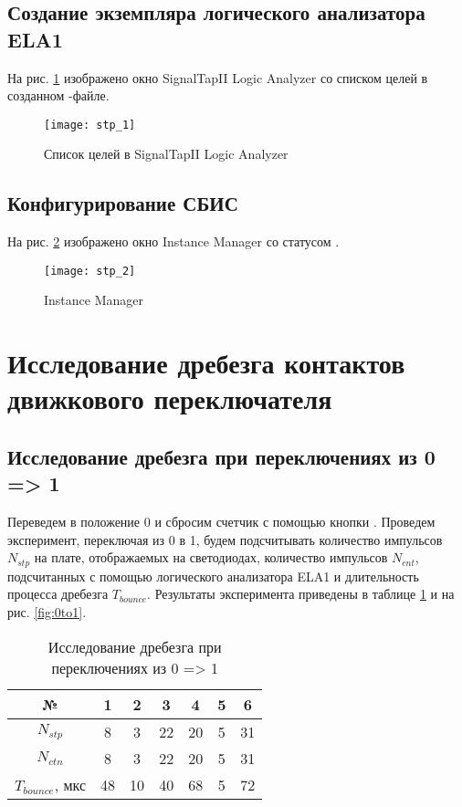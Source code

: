 \subsection{Создание экземпляра логического анализатора ELA1}

На рис. \ref{fig:stp_1} изображено окно SignalTapII Logic Analyzer со списком целей в созданном -файле.
\vspace{-0.5cm}
\begin{figure}[H]
	\begin{center}
		\texttt{[image: stp\_1]}
		\caption{Список целей в SignalTapII Logic Analyzer}
		\label{fig:stp_1}
	\end{center}
\end{figure}

\subsection{Конфигурирование СБИС}

На рис. \ref{fig:stp_2} изображено окно Instance Manager со статусом .
\vspace{-0.5cm}
\begin{figure}[H]
	\begin{center}
		\texttt{[image: stp\_2]}
		\caption{Instance Manager}
		\label{fig:stp_2}
	\end{center}
\end{figure}

\section{Исследование дребезга контактов движкового переключателя}
\label{sec:cb}

\subsection{Исследование дребезга при переключениях из 0 => 1}

Переведем  в положение 0 и сбросим счетчик с помощью кнопки . Проведем эксперимент, переключая  из 0 в 1, будем подсчитывать количество импульсов $N_{stp}$ на плате, отображаемых на светодиодах, количество импульсов $N_{cnt}$, подсчитанных с помощью логического анализатора ELA1 и длительность процесса дребезга $T_{bounce}$. Результаты эксперимента приведены в таблице \ref{tab:0to1} и на рис. \ref{fig:0to1}.

\begin{table}[H]
	\def\tabcolsep{20pt}
	\centering
	\caption{Исследование дребезга при переключениях из 0 => 1}
	\label{tab:0to1}
	\begin{tabular}{|c|c|c|c|c|c|c|}
		\hline
		№ & 1 & 2 & 3 & 4 & 5 & 6 \\ \hline
		$N_{stp}$ & 8 & 3 & 22 & 20 & 5 & 31 \\ \hline
		$N_{ctn}$ & 8 & 3 & 22 & 20 & 5 & 31 \\ \hline
		$T_{bounce}$, мкс & 48 & 10 & 40 & 68 & 5 & 72 \\ \hline
	\end{tabular}
\end{table}

